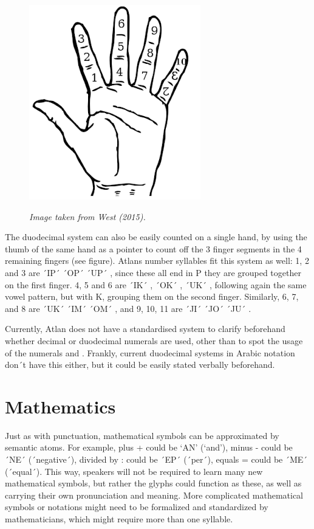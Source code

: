 \pagebreak
\begin{figure}
\includegraphics[scale=0.4]{./Images/Hand.jpeg}

	{\it \footnotesize Image taken from West (2015). }
\end{figure}

The duodecimal system can also be easily counted on a single hand, by using the thumb of the same hand as a pointer to count off the 3 finger segments in the 4 remaining fingers (see figure). Atlans number syllables fit this system as well: 1, 2 and 3 are ´IP´ \ip ´OP´ \op ´UP´ \up, since these all end in P they are grouped together on the first finger. 4, 5 and 6 are ´IK´ \raisebox{-0.5em}{\ik} , ´OK´ \raisebox{-0.5em}{\ok}, ´UK´ \raisebox{-0.5em}{\uk}, following again the same vowel pattern, but with K, grouping them on the second finger. Similarly, 6, 7, and 8 are ´UK´ \uk ´IM´ \im ´OM´ \om, and 9, 10, 11 are ´JI´ \ji ´JO´ \jo ´JU´ \ju. 

Currently, Atlan does not have a standardised system to clarify beforehand whether decimal or duodecimal numerals are used, other than to spot the usage of the numerals  and . Frankly, current duodecimal systems in Arabic notation don´t have this either, but it could be easily stated verbally beforehand.  

 

\section{Mathematics }

Just as with punctuation, mathematical symbols can be approximated by semantic atoms. For example, plus + could be ‘AN’ \an (‘and’), minus - could be ´NE´ \ne (´negative´), divided by : could be ´EP´ \raisebox{-0.5em}{\ep} (´per´), equals = could be ´ME´ \raisebox{-0.3em}{\me} (´equal´). This way, speakers will not be required to learn many new mathematical symbols, but rather the glyphs could function as these, as well as carrying their own pronunciation and meaning. More complicated mathematical symbols or notations might need to be formalized and standardized by mathematicians, which might require more than one syllable. 




